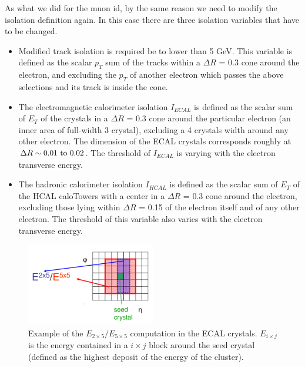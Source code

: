As what we did for the muon id, by the same reason we need to modify the isolation definition again. In this case there are three isolation variables that have to be changed.

\begin{itemize}
\item Modified track isolation is required be to lower than 5 GeV. This variable is defined as the scalar $p_{T}$ sum of the tracks within a $\Delta R$ = 0.3 cone around the electron, and excluding the $p_{T}$ of another electron which passes the above selections and its track is inside the cone.
\item The electromagnetic calorimeter isolation $I_{ECAL}$ is defined as the scalar sum of $E_{T}$ of the crystals in a $\Delta R$ = 0.3 cone around the particular electron (an inner area of full-width 3 crystal), excluding a 4 crystals width around any other electron. The dimension of the ECAL crystals corresponds roughly at $\Delta R \sim 0.01 \textup{ to } 0.02$. The threshold of $I_{ECAL}$ is varying with the electron transverse energy.
\item The hadronic calorimeter isolation $I_{HCAL}$ is defined as the scalar sum of $E_{T}$ of the HCAL caloTowers with a center in a $\Delta R$ = 0.3 cone around the electron, excluding those lying within $\Delta R$ = 0.15 of the electron itself and of any other electron\cite{CMS_AN_2012-168}. The threshold of this variable also varies with the electron transverse energy.
\end{itemize}
\newpage
\begin{figure}[hbtp]
  \begin{center}
    \includegraphics[width=0.5\textwidth]{figure/CH3/E5X5.png}
  \end{center}
  \caption{\label{fig:E5X5}Example of the $E_{2\times5}/E_{5\times5}$ computation in the ECAL crystals. $E_{i \times j}$ is the energy contained in a $i \times j$ block around the seed crystal (defined as the highest deposit of the energy of the cluster).}
\end{figure}

